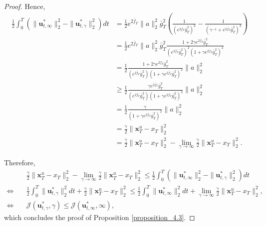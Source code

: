 \begin{proof}
Hence, 
\begin{equation}
\begin{split}
\frac{1}{2}\int_{0}^{T} \left( \|\mathbf{u}_{t, \infty}^{*}\|_2^2 - \|\mathbf{u}_{t, \gamma}^{*}\|_2^2 \right) dt
&= \frac{1}{2}e^{2\bar{f}_{T}} \|a\|_2^2 \bar{g}^2_{T} \left( \frac{1}{(e^{2\bar{f}_{T}} \bar{g}^2_{T})^2} -\frac{1}{(\gamma^{-1}+ e^{2\bar{f}_{T}} \bar{g}^2_{T})^2} \right) \\ 
&= \frac{1}{2}e^{2\bar{f}_{T}} \|a\|_2^2 \bar{g}^2_{T} \frac{1 + 2\gamma e^{2\bar{f}_{T}} \bar{g}^2_{T}}{(e^{2\bar{f}_{T}} \bar{g}^2_{T})^2 (1+ \gamma e^{2\bar{f}_{T}} \bar{g}^2_{T})^2}  \\ 
&= \frac{1}{2}\frac{1 + 2\gamma e^{2\bar{f}_{T}} \bar{g}^2_{T}}{(e^{2\bar{f}_{T}} \bar{g}^2_{T}) (1+ \gamma e^{2\bar{f}_{T}} \bar{g}^2_{T})^2} \|a\|_2^2 \\ 
&\ge \frac{1}{2}\frac{\gamma e^{2\bar{f}_{T}} \bar{g}^2_{T}}{(e^{2\bar{f}_{T}} \bar{g}^2_{T}) (1+ \gamma e^{2\bar{f}_{T}} \bar{g}^2_{T})^2} \|a\|_2^2 \\
&= \frac{1}{2}\frac{\gamma }{(1+ \gamma e^{2\bar{f}_{T}} \bar{g}^2_{T})^2} \|a\|_2^2 \\
&= \frac{\gamma}{2} \| \mathbf{x}_{T}^{u} - x_T \|_2^2  \\
&= \frac{\gamma}{2} \| \mathbf{x}_{T}^{u} - x_T \|_2^2 - \lim\limits_{\gamma \to \infty} \frac{\gamma}{2} \| \mathbf{x}_{T}^{u} - x_T \|_2^2.
\end{split}
\end{equation}

Therefore, 
\begin{align}
& \frac{\gamma}{2} \| \mathbf{x}_{T}^{u} - x_T \|_2^2 - \lim\limits_{\gamma \to \infty} \frac{\gamma}{2} \| \mathbf{x}_{T}^{u} - x_T \|_2^2 \le \frac{1}{2}\int_{0}^{T} \left( \|\mathbf{u}_{t, \infty}^{*}\|_2^2 - \|\mathbf{u}_{t, \gamma}^{*}\|_2^2 \right) dt \\
\Leftrightarrow \quad & \frac{1}{2}\int_{0}^{T} \|\mathbf{u}_{t, \gamma}^{*}\|_2^2 dt + \frac{\gamma}{2} \| \mathbf{x}_{T}^{u} - x_T \|_2^2 \le \frac{1}{2}\int_{0}^{T} \|\mathbf{u}_{t, \infty}^{*}\|_2^2 dt + \lim\limits_{\gamma \to \infty} \frac{\gamma}{2} \| \mathbf{x}_{T}^{u} - x_T \|_2^2, \\
\Leftrightarrow \quad & \mathcal{J}(\mathbf{u}_{t, \gamma}^{*}, \gamma) \le \mathcal{J}(\mathbf{u}_{t, \infty}^{*}, \infty),
\end{align}
which concludes the proof of Proposition \ref{proposition_4.3}.
\end{proof}

